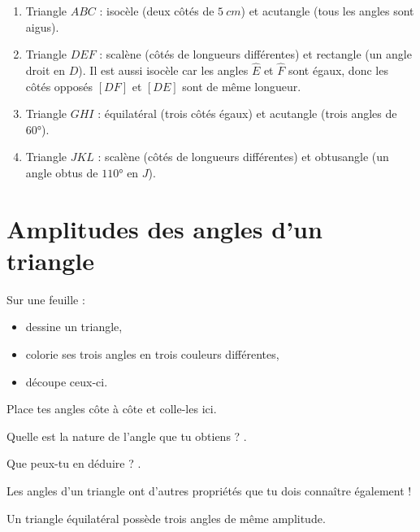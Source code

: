 \documentclass[../../syllabus_1.tex]{subfiles}
\begin{document}
\begin{solution}
    \begin{enumerate}
        \item Triangle $ABC$ : isocèle (deux côtés de $\qty{5}{cm}$) et acutangle (tous les angles sont aigus).
        \item Triangle $DEF$ : scalène (côtés de longueurs différentes) et rectangle (un angle droit en $D$). Il est aussi isocèle car les angles $\widehat{E}$ et $\widehat{F}$ sont égaux, donc les côtés opposés $[DF]$ et $[DE]$ sont de même longueur.
        \item Triangle $GHI$ : équilatéral (trois côtés égaux) et acutangle (trois angles de $\ang{60}$).
        \item Triangle $JKL$ : scalène (côtés de longueurs différentes) et obtusangle (un angle obtus de $\ang{110}$ en $J$).
    \end{enumerate}
\end{solution}

\section{Amplitudes des angles d'un triangle}
Sur une feuille :
\begin{itemize}
    \item dessine un triangle,
    \item colorie ses trois angles en trois couleurs différentes,
    \item découpe ceux-ci.
\end{itemize}
Place tes angles côte à côte et colle-les ici.
\vspace{3cm}

Quelle est la nature de l'angle que tu
obtiens ? \dotfill.

Que peux-tu en déduire ? \dotfill.

\begin{tcolorbox}[title=Somme des amplitudes des angles d'un triangle]
\end{tcolorbox}

Les angles d'un triangle ont d'autres propriétés que tu dois connaître également
!
\begin{tcolorbox}[title=Amplitude des angles dans un triangle équilatéral]
    Un triangle équilatéral possède trois angles de même amplitude.
\end{tcolorbox}
\end{document}
